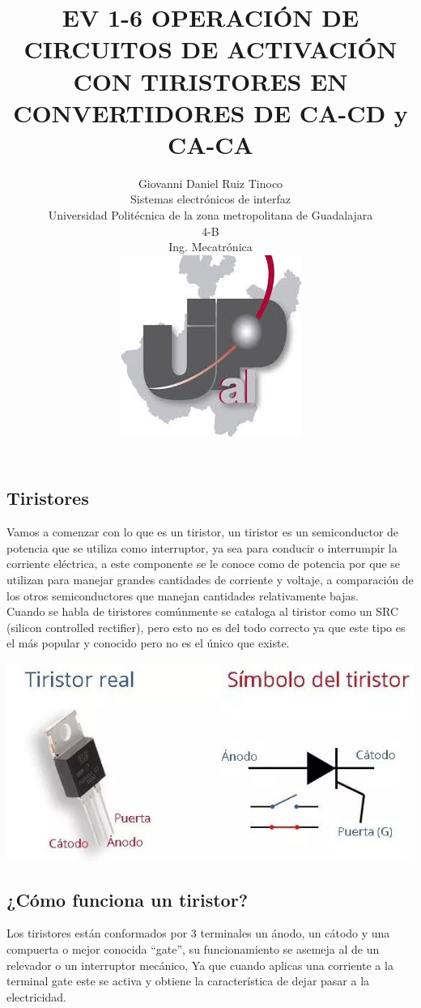 \documentclass[12pt,a4paper]{article}
\title{EV 1-6 OPERACIÓN DE CIRCUITOS DE ACTIVACIÓN CON TIRISTORES EN CONVERTIDORES DE CA-CD y CA-CA}
\author{Giovanni Daniel Ruiz Tinoco\\
\small Sistemas electrónicos de interfaz\\
  \small Universidad Politécnica de la zona metropolitana de Guadalajara\\
  \small 4-B \\
  \small Ing. Mecatrónica\\
\centering
\includegraphics[scale=2]{imagenes/upz.jpg} 
}
\begin{document}
\maketitle
\newpage
\begin{center}
\section {Tiristores}
\end{center}
Vamos a comenzar con lo que es un tiristor, un tiristor es un semiconductor de potencia que se utiliza como interruptor, ya sea para conducir o interrumpir la corriente eléctrica, a este componente se le conoce como de potencia por que se utilizan para manejar grandes cantidades de corriente y voltaje, a comparación de los otros semiconductores que manejan cantidades relativamente bajas.\\
Cuando se habla de tiristores comúnmente se cataloga al tiristor como un SRC (silicon controlled rectifier), pero esto no es del todo correcto ya que este tipo es el más popular y conocido pero no es el único que existe.\\
\begin{center}
\includegraphics[scale=1]{imagenes/tiristor.JPG} 
\subsection{¿Cómo funciona un tiristor?}
\end{center}
\begin{flushleft}
Los tiristores están conformados por 3 terminales un ánodo, un cátodo y una compuerta o mejor conocida “gate”, su funcionamiento se asemeja al de un relevador o un interruptor mecánico, Ya que cuando aplicas una corriente a la terminal gate este se activa y obtiene la característica de dejar pasar a la electricidad.\\
\end{flushleft}
\end{document}
